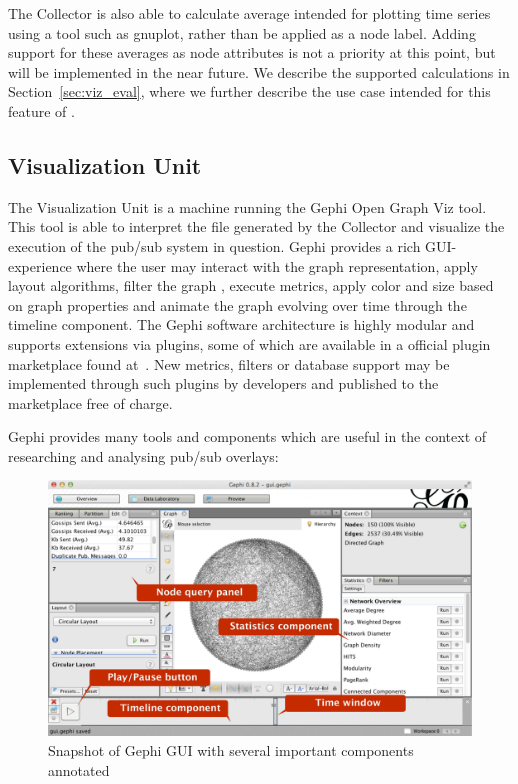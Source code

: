 The Collector is also able to calculate average intended for
plotting time series using a tool such as gnuplot, rather than be
applied as a node label. Adding support for
these averages as node attributes is not a priority at this point, but
will be implemented in the near future. We describe the supported
calculations in
Section~\ref{sec:viz_eval}, where we further describe the use case
intended for this feature of \demo.

\subsection{Visualization Unit}

The Visualization Unit is a machine running the Gephi Open Graph Viz
tool. This tool is able to interpret the \gexf{} file generated by the
Collector and visualize the execution of the pub/sub system in question.
Gephi provides a rich GUI-experience where the user may interact with
the graph representation, apply layout algorithms, filter the graph
, execute metrics, apply color and size based on graph
properties and animate the graph evolving over time through the timeline
component. The Gephi software architecture is highly modular and
supports extensions via plugins, some of which are available in a
official plugin marketplace found at~\cite{gephimarketplace}. New
metrics, filters or database support may be implemented through such
plugins by developers and published to the marketplace free of charge.

Gephi provides many tools and components which are useful in the context
of researching and analysing pub/sub overlays:

\begin{figure}[h]
    \centering
    \includegraphics[width=\textwidth]{figures/gui_ann}
    \caption{Snapshot of Gephi GUI with several important components
        annotated}
\end{figure}

